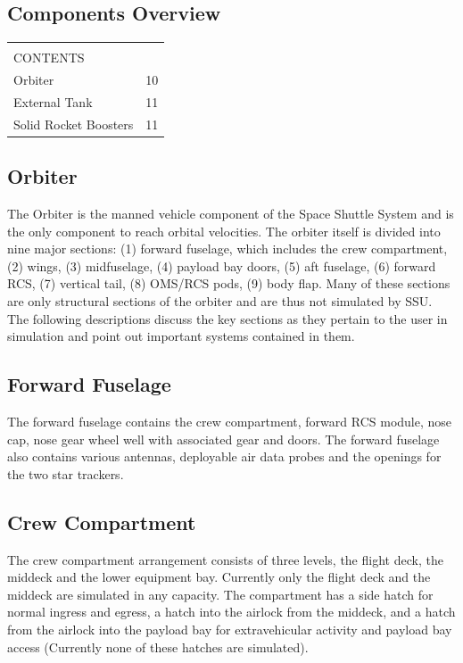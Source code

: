 \documentclass[13pt, letter,final]{article}
\begin{document}
\begin{multicols}{2}
\subsection{\large Components Overview}

\begin{tabular}{|p{7cm} p{0.25cm}|}
	\hline
	&\\[0.1cm]
	CONTENTS & \\[0.4cm]
	Orbiter & 10\\
	External Tank & 11\\
	Solid Rocket Boosters & 11\\
	\hline
\end{tabular}
\subsection*{\large Orbiter}

The Orbiter is the manned vehicle component of the Space Shuttle System and is the only component to reach orbital velocities.  The orbiter itself is divided into nine major sections: (1) forward fuselage, which includes the crew compartment, (2) wings, (3) midfuselage, (4) payload bay doors, (5) aft fuselage, (6) forward RCS, (7) vertical tail, (8) OMS/RCS pods, (9) body flap.  Many of these sections are only structural sections of the orbiter and are thus not simulated by SSU. The following descriptions discuss the key sections as they pertain to the user in simulation and point out important systems contained in them.


\subsection*{Forward Fuselage}
The forward fuselage contains the crew compartment, forward RCS module, nose cap, nose gear wheel well with associated gear and doors.  The forward fuselage also contains various antennas, deployable air data probes and the openings for the two star trackers.
\\

\subsection*{Crew Compartment}
The crew compartment arrangement consists of three levels, the flight deck, the middeck and the lower equipment bay. Currently only the flight deck and the middeck are simulated in any capacity. The compartment has a side hatch for normal ingress and egress, a hatch into the airlock from the middeck, and a hatch from the airlock into the payload bay for extravehicular activity and payload bay access (Currently none of these hatches are simulated).

\end{multicols}
\end{document}
